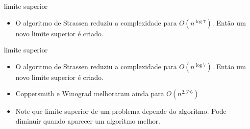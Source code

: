 \documentclass{beamer}
\begin{document}
\begin{frame}{limite superior}

\begin{itemize}
 \item O algoritmo de Strassen reduziu a complexidade para $O(n^{\log 7})$. Então um novo limite superior é criado.
\end{itemize}

\begin{center}
\end{center}
\end{frame}

\begin{frame}{limite superior}

\begin{itemize}
 \item O algoritmo de Strassen reduziu a complexidade para $O(n^{\log 7})$. Então um novo limite superior é criado.
 \item Coppersmith e Winograd melhoraram ainda para $O(n^{2.376})$
 \item Note que limite superior de um problema depende do algoritmo. Pode diminuir quando aparecer um algoritmo melhor.
\end{itemize}

\begin{center}
\end{center}
\end{frame}
 
\end{document}
